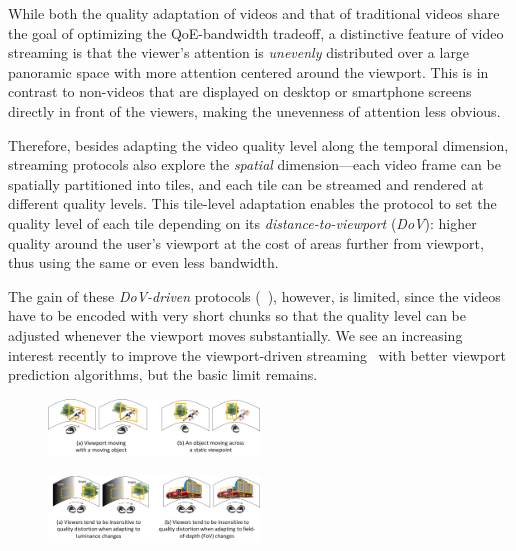 While both the quality adaptation of \vr videos and that of traditional videos share the goal of optimizing the QoE-bandwidth tradeoff, a distinctive feature of \vr video streaming is that the viewer's attention is {\em unevenly} distributed over a large panoramic space with more attention centered around the viewport. 
This is in contrast to non-\vr videos that are displayed on desktop or smartphone screens directly in front of the viewers, making the unevenness of attention less obvious.

Therefore, besides adapting the video quality level along the temporal dimension, \vr streaming protocols also explore the {\em spatial} dimension---each video frame can be spatially partitioned into tiles, and each tile can be streamed and rendered at different quality levels.
This tile-level adaptation enables the protocol to set the quality level of each tile depending on its {\em distance-to-viewport} ({\em DoV}): higher quality around the user's viewport at the cost of areas further from viewport, thus using the same or even less bandwidth. 

The gain of these {\em DoV-driven} protocols (\eg~\cite{??,??,??}), however, is limited, since the videos have to be encoded with very short chunks so that the quality level can be adjusted whenever the viewport moves substantially. 
We see an increasing interest recently to improve the viewport-driven streaming~\cite{??,??,??} with better viewport prediction algorithms, but the basic limit remains.


\begin{figure}[t!]
  \centering
  \includegraphics[width=0.5\textwidth]{figures/example-velocity.pdf}
  \caption{}
  \label{fig:luminance}
  \end{figure}

\begin{figure}[t!]
  \centering
  \includegraphics[width=0.5\textwidth]{figures/example-luminance-fov.pdf}
  \caption{}
  \label{fig:luminance}
  \end{figure}

